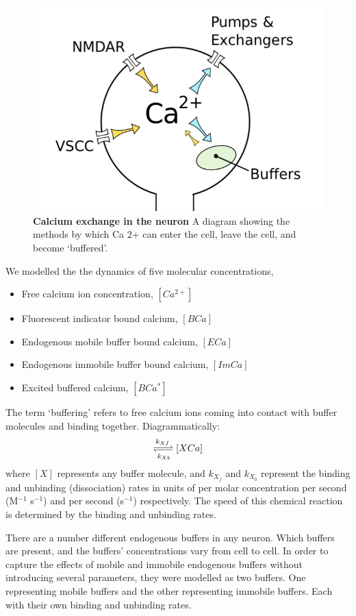 \documentclass[a4paper,12pt]{article}
\theoremstyle{definition}
\begin{document}
\begin{figure}
    \centering
    \includegraphics[width=\linewidth]{figures/cell_diagram.png}
    \caption{\textbf{Calcium exchange in the neuron} A diagram showing the methods by which Ca 2+ can enter the cell, leave the cell, and become `buffered'.}
    \label{fig:cell_diagram}
\end{figure}
We modelled the the dynamics of five molecular concentrations,
\begin{itemize}
    \item Free calcium ion concentration, $[Ca^{2+}]$
    \item Fluorescent indicator bound calcium, $[BCa]$
    \item Endogenous mobile buffer bound calcium, $[ECa]$
    \item Endogenous immobile buffer bound calcium, $[ImCa]$
    \item Excited buffered calcium, $[BCa^{\ast}]$
\end{itemize}
The term ‘buffering’ refers to free calcium ions coming into contact with buffer molecules and binding together. Diagrammatically:
\begin{align*}
    [X][Ca^{2+}] \xrightleftharpoons[k_{Xb}]{k_{Xf}} [XCa]
\end{align*}
where $[X]$ represents any buffer molecule, and $k_{X_f}$ and $k_{X_b}$ represent the binding and unbinding (dissociation) rates in units of per molar concentration per second (M$^{−1}$ s$^{−1}$) and per second (s$^{−1}$) respectively. The speed of this chemical reaction is determined by the binding and unbinding rates.

There are a number different endogenous buffers in any neuron. Which buffers are present, and the buffers’ concentrations vary from cell to cell. In order to capture the effects of mobile and immobile endogenous buffers without introducing several parameters, they were modelled as two buffers. One representing mobile buffers and the other representing immobile buffers. Each with their own binding and unbinding rates.
\end{document}
